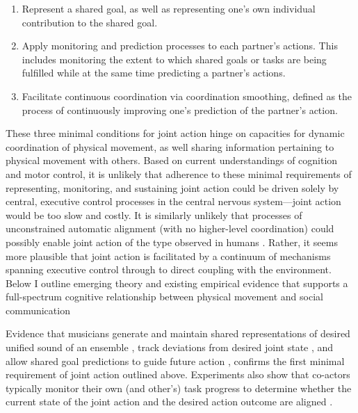 \begin{CJK}{UTF8}{gbsn}
\begin{enumerate}
  \item Represent a shared goal, as well as representing one’s own individual contribution to the shared goal.
  \item Apply monitoring and prediction processes to each partner’s actions. This includes monitoring the extent to which shared goals or tasks are being fulfilled while at the same time predicting a partner’s actions.
  \item Facilitate continuous coordination via coordination smoothing, defined as the process of continuously improving one’s prediction of the partner’s action.
\end{enumerate}

These three minimal conditions for joint action hinge on capacities for dynamic coordination of physical movement, as well sharing information pertaining to physical movement with others.  Based on current understandings of cognition and motor control, it is unlikely that adherence to these minimal requirements of representing, monitoring, and sustaining joint action could be driven solely by central, executive control processes in the central nervous system---joint action would be too slow and costly.  It is similarly unlikely that processes of unconstrained automatic alignment (with no higher-level coordination) could possibly enable joint action of the type observed in humans \citep{Fusaroli2014}.  Rather, it seems more plausible that joint action is facilitated by a continuum of mechanisms spanning executive control through to direct coupling with the environment.  Below I outline emerging theory and existing empirical evidence that supports a full-spectrum cognitive relationship between physical movement and social communication

Evidence that musicians generate and maintain shared representations of desired unified sound of an ensemble \citep{Keller2008}, track deviations from desired joint state \citep{Loehr2013}, and allow shared goal predictions to guide future action \citep{Loehr2016}, confirms the first minimal requirement of joint action outlined above.  Experiments also show that co-actors typically monitor their own (and other's) task progress to determine whether the current state of the joint action and the desired action outcome are aligned \citep{Vesper2010,Keller2012,Wolf2018}.


\end{CJK}
